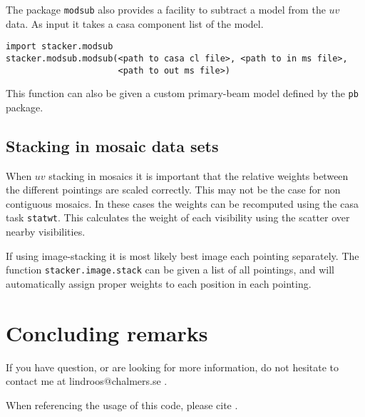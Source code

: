 \documentclass{article}
\begin{document}
The package {\tt modsub} also provides a facility to subtract a model from the $uv$ data.
As input it takes a casa component list of the model. 
\begin{verbatim}
import stacker.modsub
stacker.modsub.modsub(<path to casa cl file>, <path to in ms file>,
	                  <path to out ms file>)
\end{verbatim}
This function can also be given a custom primary-beam model defined by the {\tt pb} package.


\subsection{Stacking in mosaic data sets}
When $uv$ stacking in mosaics it is important that the relative weights between the different pointings are scaled correctly.
This may not be the case for non contiguous mosaics.
In these cases the weights can be recomputed using the casa task {\tt statwt}. 
This calculates the weight of each visibility using the scatter over nearby visibilities.

If using image-stacking it is most likely best image each pointing separately.
The function {\tt stacker.image.stack} can be given a list of all pointings,
and will automatically assign proper weights to each position in each pointing.

 

\section{Concluding remarks}
If you have question, or are looking for more information, 
do not hesitate to contact me at lindroos@chalmers.se .

When referencing the usage of this code, please cite \cite{lindroos2014}.
\end{document}

